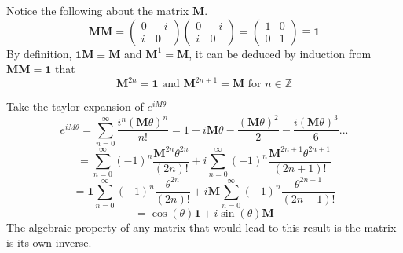 \begin{sol}
Notice the following about the matrix $\mathbf{M}$.
$$\mathbf{MM}=\begin{pmatrix}0 & -i\\i&0\end{pmatrix}\begin{pmatrix}0 & -i\\i&0\end{pmatrix}=\begin{pmatrix}
1&0\\0&1
\end{pmatrix}\equiv\mathbf{1}$$ 
By definition, $\mathbf{1M}\equiv\mathbf{M}$ and $\mathbf{M}^1=\mathbf{M}$, it can be deduced by induction from $\mathbf{MM}=\mathbf{1}$ that
$$\mathbf{M}^{2n}=\mathbf{1} \text{ and } \mathbf{M}^{2n+1}=\mathbf{M}\text{ for }n\in\mathbb{Z}$$

Take the taylor expansion of $e^{iM\theta}$
$$e^{iM\theta}=\sum_{n=0}^\infty\frac{i^n(\mathbf{M}\theta)^n}{n!}=1+i\mathbf{M}\theta-\frac{(\mathbf{M}\theta)^2}{2}-\frac{i(\mathbf{M}\theta)^3}{6}...$$ 
$$=\sum_{n=0}^\infty(-1)^n\frac{\mathbf{M}^{2n}\theta^{2n}}{(2n)!}+i\sum_{n=0}^\infty(-1)^n\frac{\mathbf{M}^{2n+1}\theta^{2n+1}}{(2n+1)!}$$
$$=\mathbf{1}\sum_{n=0}^\infty(-1)^n\frac{\theta^{2n}}{(2n)!}+i\mathbf{M}\sum_{n=0}^\infty(-1)^n\frac{\theta^{2n+1}}{(2n+1)!}$$
$$=\cos(\theta)\mathbf{1}+i\sin(\theta)\mathbf{M}$$
The algebraic property of any matrix that would lead to this result is the matrix is its own inverse.
\end{sol}